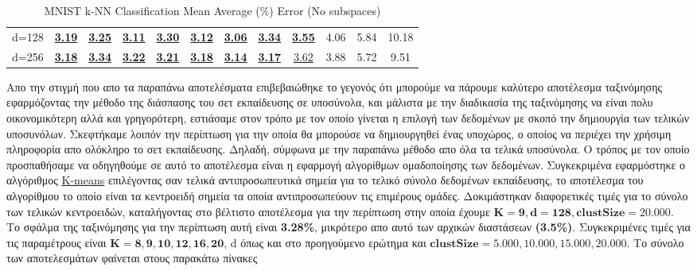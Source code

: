 \begin{table}[H]
\begin{tabular}{|c|c|c|c|c|c|c|c|c|c|c|c|}
d=128 & \underline{\textbf{3.19}} & \underline{\textbf{3.25}} & \underline{\textbf{3.11}} & \underline{\textbf{3.30}} & \underline{\textbf{3.12}} & \underline{\textbf{3.06}} & \underline{\textbf{3.34}} & \underline{\textbf{3.55}} & 4.06 & 5.84 & 10.18 \\
d=256 & \underline{\textbf{3.18}} & \underline{\textbf{3.34}} & \underline{\textbf{3.22}} & \underline{\textbf{3.21}} & \underline{\textbf{3.18}} & \underline{\textbf{3.14}} & \underline{\textbf{3.17}} & \underline{3.62} & 3.88 & 5.72 & 9.51 \\
\hline
\end{tabular}
\caption{MNIST k-NN Classification Mean Average (\%) Error (No subspaces)}
\end{table}

\par
Απο την στιγμή που απο τα παραπάνω αποτελέσματα επιβεβαιώθηκε το γεγονός ότι μπορούμε να πάρουμε καλύτερο αποτέλεσμα ταξινόμησης εφαρμόζοντας την μέθοδο της διάσπασης του σετ εκπαίδευσης σε υποσύνολα, και μάλιστα με την διαδικασία της ταξινόμησης να είναι πολυ οικονομικότερη αλλά και γρηγορότερη, εστιάσαμε στον τρόπο με τον οποίο γίνεται η επιλογή των δεδομένων με σκοπό την δημιουργία των τελικών υποσυνόλων. Σκεφτήκαμε λοιπόν την περίπτωση για την οποία θα μπορούσε να δημιουργηθεί ένας υποχώρος, ο οποίος να περιέχει την χρήσιμη πληροφορία απο ολόκληρο το σετ εκπαίδευσης. Δηλαδή, σύμφωνα με την παραπάνω μέθοδο απο όλα τα τελικά υποσύνολα. Ο τρόπος με τον οποίο προσπαθήσαμε να οδηγηθούμε σε αυτό το αποτέλεσμα είναι η εφαρμογή αλγορίθμων ομαδοποίησης των δεδομένων. Συγκεκριμένα εφαρμόστηκε ο αλγόριθμος \href{https://en.wikipedia.org/wiki/K-means_clustering}{\textlatin{K-means}} επιλέγοντας σαν τελικά αντιπροσωπευτικά σημεία για το τελικό σύνολο δεδομένων εκπαίδευσης, το αποτέλεσμα του αλγορίθμου το οποίο είναι τα κεντροειδή σημεία τα οποία αντιπροσωπεύουν τις επιμέρους ομάδες. Δοκιμάστηκαν διαφορετικές τιμές για το σύνολο των τελικών κεντροειδών, καταλήγοντας στο βέλτιστο αποτέλεσμα για την περίπτωση στην οποία έχουμε $\mathbf{K=9, d=128, clustSize=20.000}$. Το σφάλμα της ταξινόμησης για την περίπτωση αυτή είναι \textbf{3.28\%}, μικρότερο απο αυτό των αρχικών διαστάσεων \textbf{(3.5\%)}. Συγκεκριμένες τιμές για τις παραμέτρους είναι $\mathbf{K=8,9,10,12,16,20}$, \textlatin{d} όπως και στο προηγούμενο ερώτημα και $\mathbf{clustSize=5.000, 10.000, 15.000, 20.000}$. Το σύνολο των αποτελεσμάτων φαίνεται στους παρακάτω πίνακες
